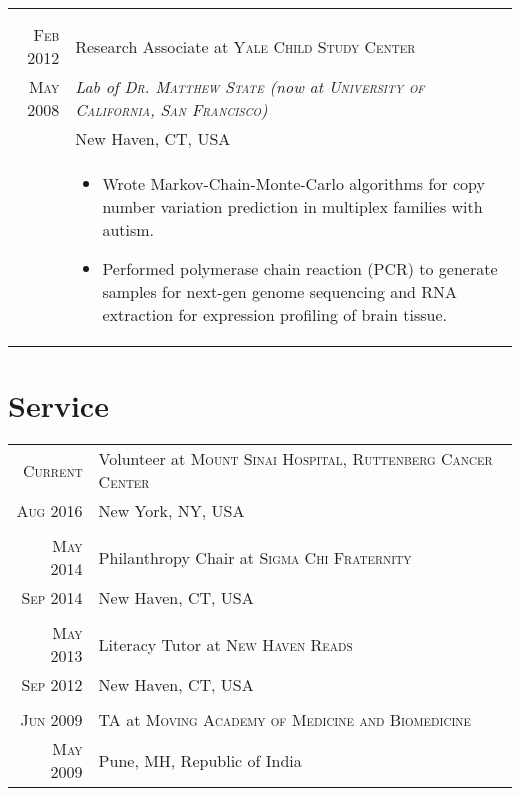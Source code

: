 \documentclass[a4paper,10pt]{article}
\begin{document}
\begin{longtable}{r|p{11cm}}
{   }\\
 \multicolumn{2}{c}{} \\
 \nopagebreak \textsc{Feb 2012} & Research Associate at \textsc{Yale Child Study Center} \\
 \nopagebreak \textsc{May 2008} & \small\emph{Lab of \textsc{Dr. Matthew State} (now at \textsc{University of California, San Francisco})} \\
 \nopagebreak & \small{New Haven, CT, USA} \\
 \nopagebreak & \footnotesize{
	\begin{itemize}
		\item[]{
			Wrote Markov-Chain-Monte-Carlo algorithms for copy number variation prediction
			in multiplex families with autism.
		}
		\item[]{
			Performed polymerase chain reaction (PCR) to generate samples for next-gen
			genome sequencing and RNA extraction for expression profiling of
			brain tissue.
		}
	\end{itemize}
   }\\
\end{longtable}

\section{Service}
\begin{longtable}{r|p{11cm}}
 \nopagebreak \textsc{Current} & Volunteer at \textsc{Mount Sinai Hospital, Ruttenberg Cancer Center} \\
 \nopagebreak \textsc{Aug 2016} &  \small{New York, NY, USA}\\
 \multicolumn{2}{c}{} \\
 \nopagebreak \textsc{May 2014} & Philanthropy Chair at \textsc{Sigma Chi Fraternity}\\
 \nopagebreak \textsc{Sep 2014} & \small{New Haven, CT, USA} \\
 \multicolumn{2}{c}{} \\
 \nopagebreak \textsc{May 2013} & Literacy Tutor at \textsc{New Haven Reads}\\
 \nopagebreak \textsc{Sep 2012} & \small{New Haven, CT, USA} \\
 \multicolumn{2}{c}{} \\
 \nopagebreak \textsc{Jun 2009} & TA at \textsc{Moving Academy of Medicine and Biomedicine} \\
 \nopagebreak \textsc{May 2009} & \small{Pune, MH, Republic of India} \\
\end{longtable}
\end{document}

